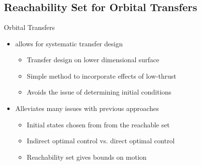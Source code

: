 
\section*{}
\subsection*{Reachability Set for Orbital Transfers}

\begin{frame}{Orbital Transfers} %
    \begin{itemize}
        \item {} allows for systematic transfer design
        \begin{itemize}
            \item Transfer design on lower dimensional \Poincare surface
            \item Simple method to incorporate effects of low-thrust 
            \item Avoids the issue of determining initial conditions
        \end{itemize}
    \pause
        \item Alleviates many issues with previous approaches
        \begin{itemize}
            \item Initial states chosen from from the reachable set
            \item Indirect optimal control vs. direct optimal control
            \item Reachability set gives bounds on motion
        \end{itemize}    
    \end{itemize}

\end{frame} %

